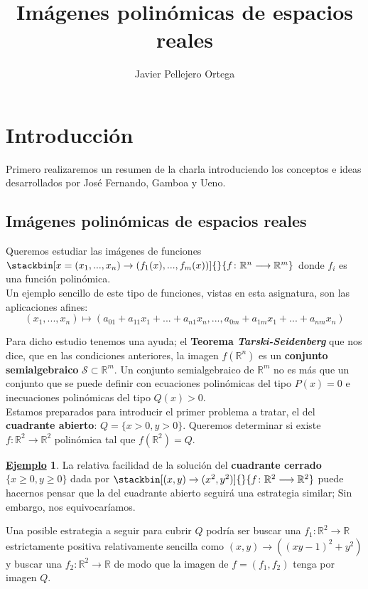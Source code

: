 \documentclass[11pt]{article}
\title{Imágenes polinómicas de espacios reales}
\date{}
\author{Javier Pellejero Ortega}
\theoremstyle{definition} %
\newtheorem*{ejem}{\underline{Ejemplo}}
\newcommand{\R}{\mathbb{R}}
\newcommand{\function}[3]{#1\colon #2\to #3}
\newcommand{\xfunction}[4]{\stackbin[#4]{}{#1\colon #2\longrightarrow #3}}
\begin{document}
\maketitle

\section{Introducción}
Primero realizaremos un resumen de la charla introduciendo los conceptos e ideas desarrollados por José Fernando, Gamboa y Ueno.

\subsection{Imágenes polinómicas de espacios reales}

Queremos estudiar las imágenes de funciones $\xfunction{f}{\R^n}{\R^m}{x=(x_1,...,x_n)\to(f_1(x),...,f_m(x))}$ donde $f_i$ es una función polinómica.\\

Un ejemplo sencillo de este tipo de funciones, vistas en esta asignatura, son las aplicaciones afines:
\[(x_1,...,x_n)\mapsto(a_{01}+a_{11}x_1+...+a_{n1}x_n,...,a_{0m}+a_{1m}x_1+...+a_{nm}x_n)\]

Para dicho estudio tenemos una ayuda; el \textbf{Teorema \textit{Tarski-Seidenberg}} que nos dice, que en las condiciones anteriores, la imagen $f(\R^n)$ es un \textbf{conjunto semialgebraico} $\mathcal{S}\subset\R^m$. Un conjunto semialgebraico de $\R^m$ no es más que un conjunto que se puede definir con ecuaciones polinómicas del tipo $P(x)=0$ e inecuaciones polinómicas del tipo $Q(x) > 0$.\\

Estamos preparados para introducir el primer problema a tratar, el del \textbf{cuadrante abierto}: $Q=\{x>0, y>0\}$. Queremos determinar si existe $\function{f}{\R^2}{\R^2}$ polinómica tal que $f(\R^2)=Q$.

\begin{ejem} La relativa facilidad de la solución del \textbf{cuadrante cerrado} $\{x\geq 0, y\geq 0\}$ dada por $\xfunction{f}{\R^2}{\R^2}{(x,y)\to(x^2,y^2)}$ puede hacernos pensar que la del cuadrante abierto seguirá una estrategia similar; Sin embargo, nos equivocaríamos.
\end{ejem}

Una posible estrategia a seguir para cubrir $Q$ podría ser buscar una $\function{f_1}{\R^2}{\R}$ estrictamente positiva relativamente sencilla como $(x,y)\to((xy-1)^2+y^2)$ y buscar una $\function{f_2}{\R^2}{\R}$ de modo que la imagen de $f=(f_1,f_2)$ tenga por imagen $Q$.\\
\end{document}
